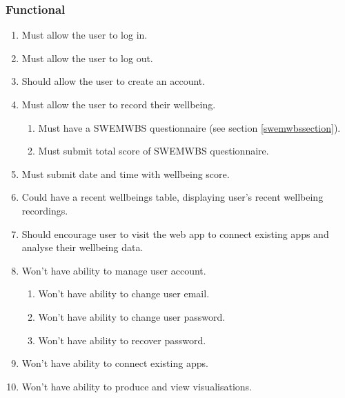 \documentclass[11pt,openright,a4paper]{report}
\begin{document}
\subsubsection{Functional}
\begin{enumerate}
\item Must allow the user to log in.
\item Must allow the user to log out.
\item Should allow the user to create an account.
\item Must allow the user to record their wellbeing.
  \begin{enumerate}
  \item Must have a SWEMWBS questionnaire (see section \ref{swemwbssection}).
  \item Must submit total score of SWEMWBS questionnaire.
  \end{enumerate}
  \item Must submit date and time with wellbeing score.
\item Could have a recent wellbeings table, displaying user's recent wellbeing recordings.
\item Should encourage user to visit the web app to connect existing apps and analyse their wellbeing data.
\item Won't have ability to manage user account.
  \begin{enumerate}
  \item Won't have ability to change user email.
  \item Won't have ability to change user password.
  \item Won't have ability to recover password.
  \end{enumerate}
\item Won't have ability to connect existing apps.
\item Won't have ability to produce and view visualisations.
\end{enumerate}
\end{document}
